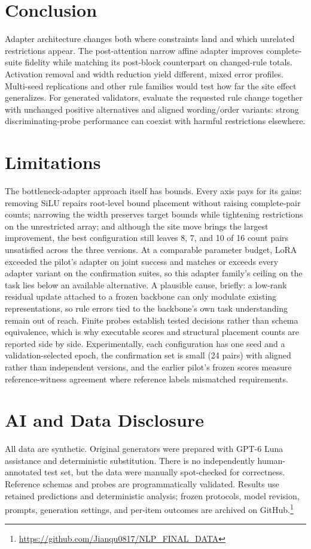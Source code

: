 \section{Conclusion}
Adapter architecture changes both where constraints land and which unrelated restrictions appear. The post-attention narrow affine adapter improves complete-suite fidelity while matching its post-block counterpart on changed-rule totals. Activation removal and width reduction yield different, mixed error profiles. Multi-seed replications and other rule families would test how far the site effect generalizes. For generated validators, evaluate the requested rule change together with unchanged positive alternatives and aligned wording/order variants: strong discriminating-probe performance can coexist with harmful restrictions elsewhere.

\section*{Limitations}
The bottleneck-adapter approach itself has bounds. Every axis pays for its gains: removing SiLU repairs root-level bound placement without raising complete-pair counts; narrowing the width preserves target bounds while tightening restrictions on the unrestricted array; and although the site move brings the largest improvement, the best configuration still leaves 8, 7, and 10 of 16 count pairs unsatisfied across the three versions. At a comparable parameter budget, LoRA exceeded the pilot's adapter on joint success and matches or exceeds every adapter variant on the confirmation suites, so this adapter family's ceiling on the task lies below an available alternative. A plausible cause, briefly: a low-rank residual update attached to a frozen backbone can only modulate existing representations, so rule errors tied to the backbone's own task understanding remain out of reach. Finite probes establish tested decisions rather than schema equivalence, which is why executable scores and structural placement counts are reported side by side. Experimentally, each configuration has one seed and a validation-selected epoch, the confirmation set is small (24 pairs) with aligned rather than independent versions, and the earlier pilot's frozen scores measure reference-witness agreement where reference labels mismatched requirements.

\section*{AI and Data Disclosure}
All data are synthetic. Original generators were prepared with GPT-6 Luna assistance and deterministic substitution. There is no independently human-annotated test set, but the data were manually spot-checked for correctness. Reference schemas and probes are programmatically validated. Results use retained predictions and deterministic analysis; frozen protocols, model revision, prompts, generation settings, and per-item outcomes are archived on GitHub.\footnote{\url{https://github.com/Jianqu0817/NLP_FINAL_DATA}}
